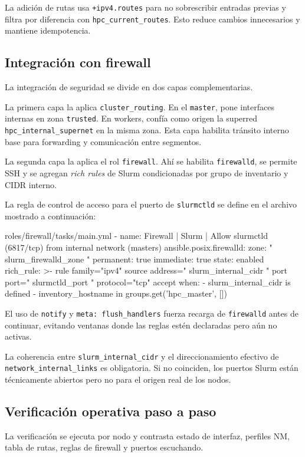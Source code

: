 La adición de rutas usa \texttt{+ipv4.routes} para no sobrescribir entradas previas y filtra por diferencia con \texttt{hpc\_current\_routes}. Esto reduce cambios innecesarios y mantiene idempotencia.

\subsection{Integración con firewall}
La integración de seguridad se divide en dos capas complementarias.

La primera capa la aplica \texttt{cluster\_routing}. En el \texttt{master}, pone interfaces internas en zona \texttt{trusted}. En workers, confía como origen la superred \texttt{hpc\_internal\_supernet} en la misma zona. Esta capa habilita tránsito interno base para forwarding y comunicación entre segmentos.

La segunda capa la aplica el rol \texttt{firewall}. Ahí se habilita \texttt{firewalld}, se permite SSH y se agregan \textit{rich rules} de Slurm condicionadas por grupo de inventario y CIDR interno.

La regla de control de acceso para el puerto de \texttt{slurmctld} se define en el archivo mostrado a continuación:

\begin{filecode}{roles/firewall/tasks/main.yml}
- name: Firewall | Slurm | Allow slurmctld (6817/tcp) from internal network (masters)
  ansible.posix.firewalld:
    zone: "{{ slurm_firewalld_zone }}"
    permanent: true
    immediate: true
    state: enabled
    rich_rule: >-
      rule family="ipv4"
      source address="{{ slurm_internal_cidr }}"
      port port="{{ slurmctld_port }}" protocol="tcp"
      accept
  when:
    - slurm_internal_cidr is defined
    - inventory_hostname in groups.get('hpc_master', [])
\end{filecode}

El uso de \texttt{notify} y \texttt{meta: flush\_handlers} fuerza recarga de \texttt{firewalld} antes de continuar, evitando ventanas donde las reglas estén declaradas pero aún no activas.

La coherencia entre \texttt{slurm\_internal\_cidr} y el direccionamiento efectivo de \texttt{network\_internal\_links} es obligatoria. Si no coinciden, los puertos Slurm están técnicamente abiertos pero no para el origen real de los nodos.

\subsection{Verificación operativa paso a paso}
La verificación se ejecuta por nodo y contrasta estado de interfaz, perfiles NM, tabla de rutas, reglas de firewall y puertos escuchando.

